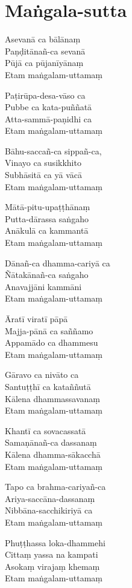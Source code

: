 \chapter{Maṅgala-sutta}

Asevanā ca bālānaṃ\\
Paṇḍitānañ-ca sevanā\\
Pūjā ca pūjanīyānaṃ\\
Etam maṅgalam-uttamaṃ

Paṭirūpa-desa-vāso ca\\
Pubbe ca kata-puññatā\\
Atta-sammā-paṇidhi ca\\
Etam maṅgalam-uttamaṃ

Bāhu-saccañ-ca sippañ-ca,\\
Vinayo ca susikkhito\\
Subhāsitā ca yā vācā\\
Etam maṅgalam-uttamaṃ

Mātā-pitu-upaṭṭhānaṃ\\
Putta-dārassa saṅgaho\\
Anākulā ca kammantā\\
Etam maṅgalam-uttamaṃ

Dānañ-ca dhamma-cariyā ca\\
Ñātakānañ-ca saṅgaho\\
Anavajjāni kammāni\\
Etam maṅgalam-uttamaṃ

Āratī viratī pāpā\\
Majja-pānā ca saññamo\\
Appamādo ca dhammesu\\
Etam maṅgalam-uttamaṃ

Gāravo ca nivāto ca\\
Santuṭṭhī ca kataññutā\\
Kālena dhammassavanaṃ\\
Etam maṅgalam-uttamaṃ

Khantī ca sovacassatā\\
Samaṇānañ-ca dassanaṃ\\
Kālena dhamma-sākacchā\\
Etam maṅgalam-uttamaṃ

Tapo ca brahma-cariyañ-ca\\
Ariya-saccāna-dassanaṃ\\
Nibbāna-sacchikiriyā ca\\
Etam maṅgalam-uttamaṃ

Phuṭṭhassa loka-dhammehi\\
Cittaṃ yassa na kampati\\
Asokaṃ virajaṃ khemaṃ\\
Etam maṅgalam-uttamaṃ

